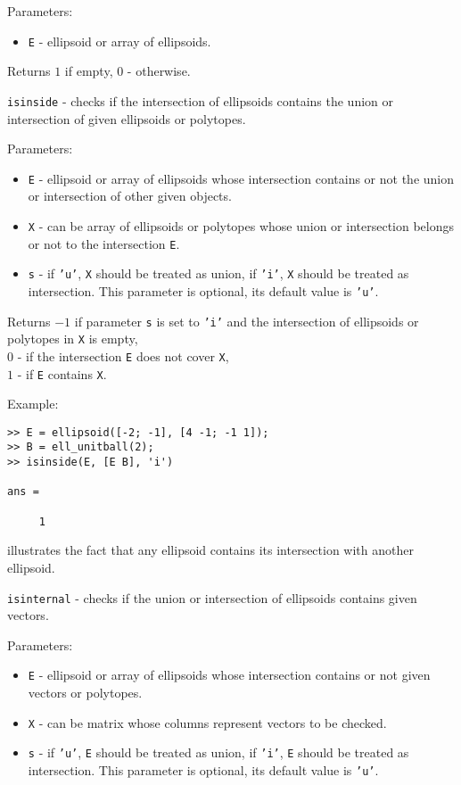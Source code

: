 Parameters:
\begin{itemize}
\item {\tt E} - ellipsoid or array of ellipsoids.
\end{itemize}

Returns $1$ if empty, $0$ - otherwise.

\newpage

{\Large {\tt isinside}} - checks if the intersection of ellipsoids contains
the union or intersection of given ellipsoids or polytopes.

Parameters:
\begin{itemize}
\item {\tt E} - ellipsoid or array of ellipsoids whose intersection contains
or not the union or intersection of other given objects.
\item {\tt X} - can be array of ellipsoids or polytopes whose union or
intersection belongs or not to the intersection {\tt E}.
\item {\tt s} - if {\tt 'u'}, {\tt X} should be treated as union,
if {\tt 'i'}, {\tt X} should be treated as intersection. This parameter
is optional, its default value is {\tt 'u'}.
\end{itemize}

Returns $-1$ if parameter {\tt s} is set to {\tt 'i'} and the intersection
of ellipsoids or polytopes in {\tt X} is empty,\\
$0$ - if the intersection {\tt E} does not cover {\tt X},\\
$1$ - if {\tt E} contains {\tt X}.

Example:
{\tt \begin{verbatim}
>> E = ellipsoid([-2; -1], [4 -1; -1 1]);
>> B = ell_unitball(2);
>> isinside(E, [E B], 'i')

ans =

     1
\end{verbatim} }
illustrates the fact that any ellipsoid contains its intersection with
another ellipsoid.

\newpage

{\Large {\tt isinternal}} - checks if the union or intersection of ellipsoids
contains given vectors.

Parameters:
\begin{itemize}
\item {\tt E} - ellipsoid or array of ellipsoids whose intersection contains
or not given vectors or polytopes.
\item {\tt X} - can be matrix whose columns represent vectors to be checked.
\item {\tt s} - if {\tt 'u'}, {\tt E} should be treated as union,
if {\tt 'i'}, {\tt E} should be treated as intersection. This parameter
is optional, its default value is {\tt 'u'}.
\end{itemize}

